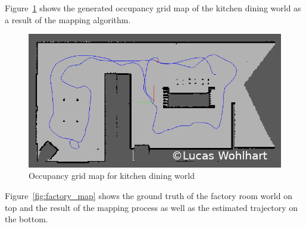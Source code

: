 \documentclass[10pt,journal,compsoc]{IEEEtran}
\begin{document}
Figure~\ref{fig:kitchen_occupancy_grid} shows the generated occupancy grid map of the kitchen dining world as a result of the mapping algorithm.

\begin{figure}[thpb]
    \centering
    \includegraphics[width=\linewidth]{img/kitchen_occupancy_grid}
    \caption{Occupancy grid map for kitchen dining world}
    \label{fig:kitchen_occupancy_grid}
\end{figure}

Figure~\ref{fig:factory_map} shows the ground truth of the factory room world on top and the result of the mapping process as well as the estimated trajectory on the bottom.
\end{document}
